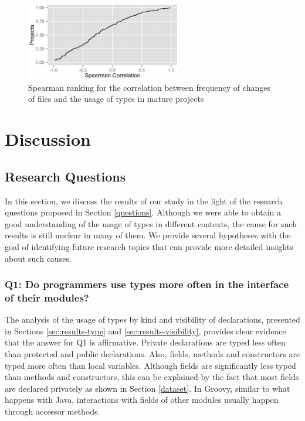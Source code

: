 \documentclass[msc]{ppgccufmg}
\begin{document}
\begin{figure}[h]
\centering \includegraphics[width=0.6\textwidth]{../aosd_2014/analysis/result/change_commits_distribution.png} 
\caption{Spearman ranking for the correlation between frequency of changes of files and the usage of types in mature projects}
\label{fig:change_spearman} 
\end{figure}
















%
%
\chapter{Discussion\label{discussion}}

\section{Research Questions\label{questions-answers}}
In this section, we discuss the results of our study in the light of the research questions proposed in Section \ref{questions}.
Although we were able to obtain a good understanding of the usage of types in different contexts, the cause for such results is still unclear in many of them.
We provide several hypotheses with the goal of identifying future research topics that can provide more detailed insights about such causes.

\subsection*{Q1: Do programmers use types more often in the interface of their modules?\label{discussion-q1}}
The analysis of the usage of types by kind and visibility of declarations, presented in Sections \ref{sec:results-type} and \ref{sec:results-visibility}, provides clear evidence that the answer for Q1 is affirmative.
Private declarations are typed less often than protected and public declarations.
Also, fields, methods and constructors are typed more often than local variables.
Although fields are significantly less typed than methods and constructors, this can be explained by the fact that most fields are declared privately as shown in Section \ref{dataset}.
In Groovy, similar to what happens with Java, interactions with fields of other modules usually happen through accessor methods.
\end{document}
